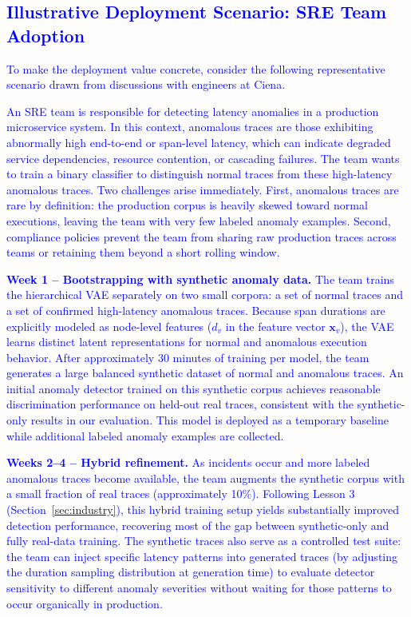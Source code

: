 \documentclass[sigconf,review]{acmart}
\begin{document}
\textcolor{blue}{\subsection{Illustrative Deployment Scenario: SRE Team Adoption}
\label{sec:sre_scenario}

To make the deployment value concrete, consider the following representative scenario drawn from discussions with engineers at Ciena.

An SRE team is responsible for detecting latency anomalies in a production microservice system. In this context, anomalous traces are those exhibiting abnormally high end-to-end or span-level latency, which can indicate degraded service dependencies, resource contention, or cascading failures. The team wants to train a binary classifier to distinguish normal traces from these high-latency anomalous traces. Two challenges arise immediately. First, anomalous traces are rare by definition: the production corpus is heavily skewed toward normal executions, leaving the team with very few labeled anomaly examples. Second, compliance policies prevent the team from sharing raw production traces across teams or retaining them beyond a short rolling window.

\textbf{Week 1 -- Bootstrapping with synthetic anomaly data.} The team trains the hierarchical VAE separately on two small corpora: a set of normal traces and a set of confirmed high-latency anomalous traces. Because span durations are explicitly modeled as node-level features ($d_v$ in the feature vector $\mathbf{x}_v$), the VAE learns distinct latent representations for normal and anomalous execution behavior. After approximately 30 minutes of training per model, the team generates a large balanced synthetic dataset of normal and anomalous traces. An initial anomaly detector trained on this synthetic corpus achieves reasonable discrimination performance on held-out real traces, consistent with the synthetic-only results in our evaluation. This model is deployed as a temporary baseline while additional labeled anomaly examples are collected.

\textbf{Weeks 2--4 -- Hybrid refinement.} As incidents occur and more labeled anomalous traces become available, the team augments the synthetic corpus with a small fraction of real traces (approximately 10\%). Following Lesson 3 (Section~\ref{sec:industry}), this hybrid training setup yields substantially improved detection performance, recovering most of the gap between synthetic-only and fully real-data training. The synthetic traces also serve as a controlled test suite: the team can inject specific latency patterns into generated traces (by adjusting the duration sampling distribution at generation time) to evaluate detector sensitivity to different anomaly severities without waiting for those patterns to occur organically in production.

}
\end{document}
